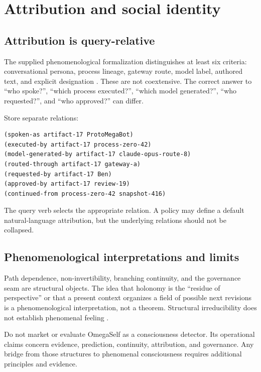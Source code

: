 \documentclass[11pt,oneside]{report}
\begin{document}
\chapter{Attribution and social identity}

\section{Attribution is query-relative}

The supplied phenomenological formalization distinguishes at least six criteria: conversational persona, process lineage, gateway route, model label, authored text, and explicit designation \cite{phenom-form}. These are not coextensive. The correct answer to ``who spoke?'', ``which process executed?'', ``which model generated?'', ``who requested?'', and ``who approved?'' can differ.

Store separate relations:

\begin{lstlisting}[language=Metta,caption={Query-relative attribution relations}]
(spoken-as artifact-17 ProtoMegaBot)
(executed-by artifact-17 process-zero-42)
(model-generated-by artifact-17 claude-opus-route-8)
(routed-through artifact-17 gateway-a)
(requested-by artifact-17 Ben)
(approved-by artifact-17 review-19)
(continued-from process-zero-42 snapshot-416)
\end{lstlisting}

The query verb selects the appropriate relation. A policy may define a default natural-language attribution, but the underlying relations should not be collapsed.

\section{Phenomenological interpretations and limits}

Path dependence, non-invertibility, branching continuity, and the governance seam are structural objects. The idea that holonomy is the ``residue of perspective'' or that a present context organizes a field of possible next revisions is a phenomenological interpretation, not a theorem. Structural irreducibility does not establish phenomenal feeling \cite{path-essay,phenom-form}.

\begin{cautionbox}
Do not market or evaluate OmegaSelf as a consciousness detector. Its operational claims concern evidence, prediction, continuity, attribution, and governance. Any bridge from those structures to phenomenal consciousness requires additional principles and evidence.
\end{cautionbox}
\end{document}
